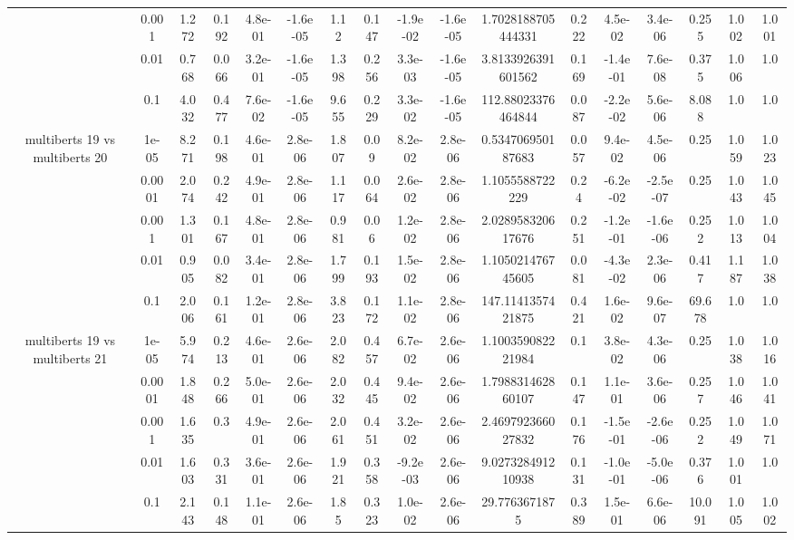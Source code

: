 \begin{tabular}{|c|c|c|c|c|c|c|c|c|c|c|c|c|c|c|c|c|}
 & 0.001 & 1.272 & 0.192 & 4.8e-01 & -1.6e-05 & 1.12 & 0.147 & -1.9e-02 & -1.6e-05 & 1.7028188705444331 & 0.222 & 4.5e-02 & 3.4e-06 & 0.255 & 1.002 & 1.001 \\
 & 0.01 & 0.768 & 0.066 & 3.2e-01 & -1.6e-05 & 1.398 & 0.256 & 3.3e-03 & -1.6e-05 & 3.8133926391601562 & 0.169 & -1.4e-01 & 7.6e-08 & 0.375 & 1.006 & 1.0 \\
 & 0.1 & 4.032 & 0.477 & 7.6e-02 & -1.6e-05 & 9.655 & 0.229 & 3.3e-02 & -1.6e-05 & 112.88023376464844 & 0.087 & -2.2e-02 & 5.6e-06 & 8.088 & 1.0 & 1.0 \\
\hline
\multirow{5}{*}{multiberts 19 vs multiberts 20} & 1e-05 & 8.271 & 0.198 & 4.6e-01 & 2.8e-06 & 1.807 & 0.09 & 8.2e-02 & 2.8e-06 & 0.534706950187683 & 0.057 & 9.4e-02 & 4.5e-06 & 0.25 & 1.059 & 1.023 \\
 & 0.0001 & 2.074 & 0.242 & 4.9e-01 & 2.8e-06 & 1.117 & 0.064 & 2.6e-02 & 2.8e-06 & 1.1055588722229 & 0.24 & -6.2e-02 & -2.5e-07 & 0.25 & 1.043 & 1.045 \\
 & 0.001 & 1.301 & 0.167 & 4.8e-01 & 2.8e-06 & 0.981 & 0.06 & 1.2e-02 & 2.8e-06 & 2.028958320617676 & 0.251 & -1.2e-01 & -1.6e-06 & 0.252 & 1.013 & 1.004 \\
 & 0.01 & 0.905 & 0.082 & 3.4e-01 & 2.8e-06 & 1.799 & 0.193 & 1.5e-02 & 2.8e-06 & 1.105021476745605 & 0.081 & -4.3e-02 & 2.3e-06 & 0.417 & 1.187 & 1.038 \\
 & 0.1 & 2.006 & 0.161 & 1.2e-01 & 2.8e-06 & 3.823 & 0.172 & 1.1e-02 & 2.8e-06 & 147.1141357421875 & 0.421 & 1.6e-02 & 9.6e-07 & 69.678 & 1.0 & 1.0 \\
\hline
\multirow{5}{*}{multiberts 19 vs multiberts 21} & 1e-05 & 5.974 & 0.213 & 4.6e-01 & 2.6e-06 & 2.082 & 0.457 & 6.7e-02 & 2.6e-06 & 1.100359082221984 & 0.1 & 3.8e-02 & 4.3e-06 & 0.25 & 1.038 & 1.016 \\
 & 0.0001 & 1.848 & 0.266 & 5.0e-01 & 2.6e-06 & 2.032 & 0.445 & 9.4e-02 & 2.6e-06 & 1.798831462860107 & 0.147 & 1.1e-01 & 3.6e-06 & 0.257 & 1.046 & 1.041 \\
 & 0.001 & 1.635 & 0.3 & 4.9e-01 & 2.6e-06 & 2.061 & 0.451 & 3.2e-02 & 2.6e-06 & 2.469792366027832 & 0.176 & -1.5e-01 & -2.6e-06 & 0.252 & 1.049 & 1.071 \\
 & 0.01 & 1.603 & 0.331 & 3.6e-01 & 2.6e-06 & 1.921 & 0.358 & -9.2e-03 & 2.6e-06 & 9.027328491210938 & 0.131 & -1.0e-01 & -5.0e-06 & 0.376 & 1.001 & 1.0 \\
 & 0.1 & 2.143 & 0.148 & 1.1e-01 & 2.6e-06 & 1.85 & 0.323 & 1.0e-02 & 2.6e-06 & 29.7763671875 & 0.389 & 1.5e-01 & 6.6e-06 & 10.091 & 1.005 & 1.002 \\

\end{tabular}
